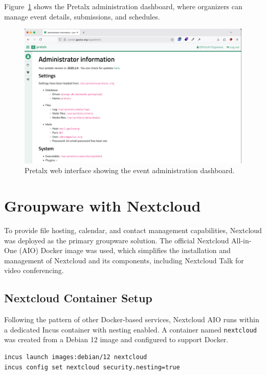 Figure~\ref{fig:pretalx-admin} shows the Pretalx administration dashboard, where organizers can manage event details, submissions, and schedules.

\begin{figure}[H]
	\centering
	\includegraphics[width=\textwidth]{imaxes/pretalx-admin.png}
	\caption{Pretalx web interface showing the event administration dashboard.}
	\label{fig:pretalx-admin}
\end{figure}

\section{Groupware with Nextcloud}

To provide file hosting, calendar, and contact management capabilities, Nextcloud was deployed as the primary groupware solution. The official Nextcloud All-in-One (AIO) Docker image\cite{nextcloud-aio} was used, which simplifies the installation and management of Nextcloud and its components, including Nextcloud Talk for video conferencing.

\subsection*{Nextcloud Container Setup}

Following the pattern of other Docker-based services, Nextcloud AIO runs within a dedicated Incus container with nesting enabled. A container named \texttt{nextcloud} was created from a Debian 12 image and configured to support Docker.

\begin{lstlisting}[language=bash,caption={Creating and configuring the Nextcloud container.}]
incus launch images:debian/12 nextcloud
incus config set nextcloud security.nesting=true
\end{lstlisting}

